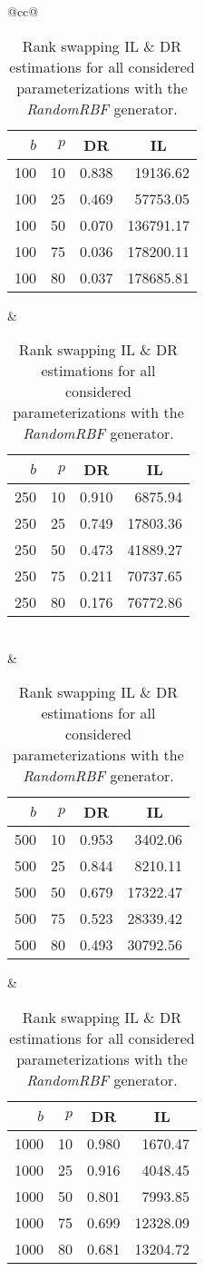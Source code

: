 \begin{table}[H]
	\centering
	\begin{tabular}{@{}cc@{}}
		\begin{tabular}{@{}rrrr@{}}
			\toprule
			$b$ & $p$ & \multicolumn{1}{c}{DR} & \multicolumn{1}{c}{IL} \\ \midrule
			100  & 10 & 0.838 & 19136.62  \\
			100  & 25 & 0.469 & 57753.05  \\
			100  & 50 & 0.070 & 136791.17 \\
			100  & 75 & 0.036 & 178200.11 \\
			100  & 80 & 0.037 & 178685.81 \\ \bottomrule
		\end{tabular}
		&
		\begin{tabular}{@{}rrrr@{}}
			\toprule
			$b$ & $p$ & \multicolumn{1}{c}{DR} & \multicolumn{1}{c}{IL} \\ \midrule
			250  & 10 & 0.910 & 6875.94   \\
			250  & 25 & 0.749 & 17803.36  \\
			250  & 50 & 0.473 & 41889.27  \\
			250  & 75 & 0.211 & 70737.65  \\
			250  & 80 & 0.176 & 76772.86  \\ \bottomrule
		\end{tabular}
		\\ & \\
		\begin{tabular}{@{}rrrr@{}}
		\toprule
			$b$ & $p$ & \multicolumn{1}{c}{DR} & \multicolumn{1}{c}{IL} \\ \midrule
			500  & 10 & 0.953 & 3402.06   \\
			500  & 25 & 0.844 & 8210.11   \\
			500  & 50 & 0.679 & 17322.47  \\
			500  & 75 & 0.523 & 28339.42  \\
			500  & 80 & 0.493 & 30792.56  \\ \bottomrule
		\end{tabular}
		&
		\begin{tabular}{@{}rrrr@{}}
			\toprule
			$b$ & $p$ & \multicolumn{1}{c}{DR} & \multicolumn{1}{c}{IL} \\ \midrule
			1000 & 10 & 0.980 & 1670.47   \\
			1000 & 25 & 0.916 & 4048.45   \\
			1000 & 50 & 0.801 & 7993.85   \\
			1000 & 75 & 0.699 & 12328.09  \\
			1000 & 80 & 0.681 & 13204.72  \\ \bottomrule
		\end{tabular}
	\end{tabular}
	\caption[Rank swapping DR \& IL estimations (RandomRBF).]{Rank swapping IL \& DR estimations for all considered parameterizations with the \textit{RandomRBF} generator.}
	\label{table:results-rbf-rankswapping}
\end{table}

